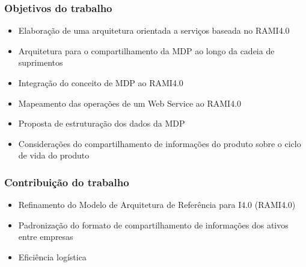 \documentclass[10pt]{beamer}
\begin{document}
\begin{frame}
	
	\frametitle{Objetivos do trabalho}
	
	\begin{itemize}
		\item Elaboração de uma arquitetura orientada a serviços baseada no RAMI4.0
		\item Arquitetura para o compartilhamento da MDP ao longo da cadeia de suprimentos
		\item Integração do conceito de MDP ao RAMI4.0
		\item Mapeamento das operações de um Web Service ao RAMI4.0
		\item Proposta de estruturação dos dados da MDP
		\item Considerações do compartilhamento de informações do produto sobre o ciclo de vida do produto
	\end{itemize}

\end{frame}

\begin{frame}
	
	\frametitle{Contribuição do trabalho}
	
	\begin{itemize}
		\item Refinamento do Modelo de Arquitetura de Referência para I4.0 (RAMI4.0)
		\item Padronização do formato de compartilhamento de informações dos ativos entre empresas
		\item Eficiência logística
	\end{itemize}
	
	
	
\end{frame}

\end{document}
